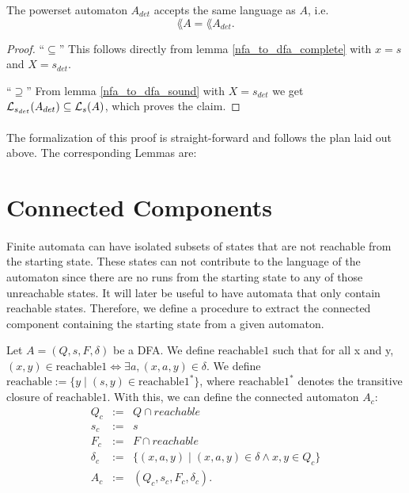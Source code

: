 \begin{theorem}
    The powerset automaton $A_{det}$ accepts the same language as $A$, i.e.
    \begin{equation*}        
        \lang{A} = \lang{A_{det}}.        
    \end{equation*}
\end{theorem}
\begin{proof}
    ``$\subseteq$'' 
    This follows directly from lemma \ref{nfa_to_dfa_complete} with $x = s$ and $X = {s}_{det}$.

    ``$\supseteq$''
    From lemma \ref{nfa_to_dfa_sound} with $X = {s}_{det}$ we get 
    $\mathcal{L}_{s_{det}}(A_{det}) \subseteq \mathcal{L}_{s}(A)$, which proves the claim.
\end{proof}

\paragraph{}
The formalization of this proof is straight-forward and follows the plan laid out above. 
The corresponding Lemmas are:


\section{Connected Components}
\paragraph{} 
Finite automata can have isolated subsets of states that are not reachable from the starting state. 
These states can not contribute to the language of the automaton since there are no runs from the starting state to any of those unreachable states.
It will later be useful to have automata that only contain reachable states. 
Therefore, we define a procedure to extract the connected component containing the starting state from a given automaton.

\begin{definition}
    \label{A_c}
    Let $A = (Q, s, F, \delta)$ be a DFA.
    We define $\mathrm{reachable1}$ such that for all x and y, 
    $(x,y) \in \mathrm{reachable1} \iff \exists a, (x,a,y) \in \delta$.
    We define $\mathrm{reachable} := \{y \; | \; (s,y) \in \mathrm{reachable1}^*\}$, 
    where $\mathrm{reachable1}^*$ denotes the transitive closure of $\mathrm{reachable1}$.
    With this, we can define the connected automaton $A_c$:
    \begin{eqnarray*}
        Q_c & := & Q \cap reachable \\
        s_c & := & s \\
        F_c & := & F \cap reachable \\
        \delta_c & := & \{(x, a, y) \; | \; (x, a, y) \in \delta \wedge x,y \in Q_c \} \\
        A_c &:=& (Q_c, s_c, F_c, \delta_c).
    \end{eqnarray*}
\end{definition}

